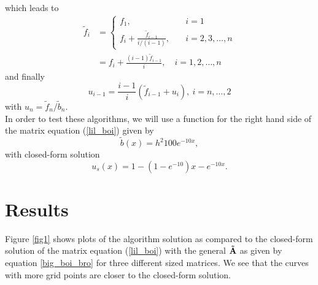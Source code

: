 \documentclass[notitlepage, reprint, nofootinbib]{revtex4-1}
\begin{document}
which leads to
\begin{align}
	\tilde{f}_i&=\begin{cases}f_1,\quad &i=1\\f_i+\frac{\tilde{f}_{i-1}}{i/(i-1)},\quad&i=2,3,\dots, n\end{cases}\nonumber\\
	&=f_i+\frac{(i-1)\tilde{f}_{i-1}}{i},\quad i=1,2,\dots,n\label{algo2f}
\end{align}
and finally 
\begin{equation}\label{algo2u}u_{i-1}=\frac{i-1}{i}(\tilde{f}_{i-1}+u_i),\ i=n,\dots,2\end{equation}
with $u_n=\tilde{f}_n/\tilde{b}_n$.\\[2mm]
In order to test these algorithms, we will use a function for the right hand side of the matrix equation (\ref{lil_boi}) given by
\begin{equation}\label{test_func}\tilde{b}(x)= h^2 100e^{-10x},\end{equation}
with closed-form solution 
\begin{equation}\label{test_func_sol}u_s(x)=1-(1-e^{-10})x-e^{-10x}.\end{equation}



\section{Results}
Figure \ref{fig1} shows plots of the algorithm solution as compared to the closed-form solution of the matrix equation (\ref{lil_boi}) with the general $\vb{\tilde{A}}$ as given by equation \ref{big_boi_bro} for three different sized matrices. We see that the curves with more grid points are closer to the closed-form solution. 
\end{document}

